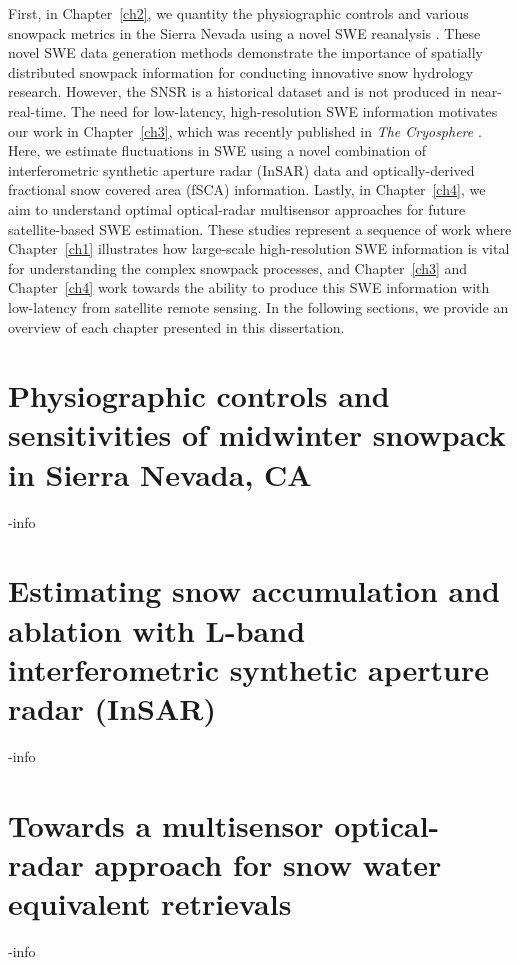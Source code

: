 First, in Chapter~\ref{ch2}, we quantity the physiographic controls and various snowpack metrics in the Sierra Nevada using a novel SWE reanalysis \citep{margulisLandsatEraSierraNevada2016}. These novel SWE data generation methods demonstrate the importance of spatially distributed snowpack information for conducting innovative snow hydrology research. However, the SNSR is a historical dataset and is not produced in near-real-time. The need for low-latency, high-resolution SWE information motivates our work in Chapter~\ref{ch3}, which was recently published in \emph{The Cryosphere} \citep{tarriconeEstimatingSnowAccumulation2023a}. Here, we estimate fluctuations in SWE using a novel combination of interferometric synthetic aperture radar (InSAR) data and optically-derived fractional snow covered area (fSCA) information. Lastly, in Chapter~\ref{ch4}, we aim to understand optimal optical-radar multisensor approaches for future satellite-based SWE estimation. These studies represent a sequence of work where Chapter~\ref{ch1} illustrates how large-scale high-resolution SWE information is vital for understanding the complex snowpack processes, and Chapter~\ref{ch3} and Chapter~\ref{ch4} work towards the ability to produce this SWE information with low-latency from satellite remote sensing. In the following sections, we provide an overview of each chapter presented in this dissertation. 

\hypertarget{ch1-intro}{\section{Physiographic controls and sensitivities of midwinter snowpack in Sierra Nevada, CA}\label{ch1-intro}}

-info

\hypertarget{ch1-intro-1}{\section{Estimating snow accumulation and ablation with L-band interferometric synthetic aperture radar (InSAR)}\label{ch1-intro-1}}

-info

\hypertarget{ch1-intro-2}{\section{Towards a multisensor optical-radar approach for snow water equivalent retrievals}\label{ch1-intro-2}}

-info

